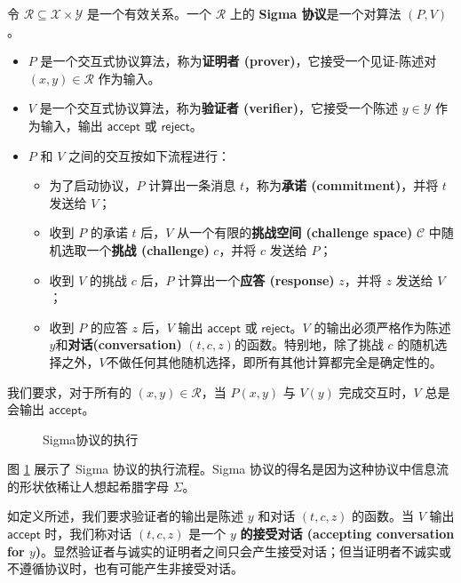 \begin{definition}[Sigma 协议]
令 $\mathcal{R}\subseteq\mathcal{X}×\mathcal{Y}$ 是一个有效关系。一个 $\mathcal{R}$ 上的 \textbf{Sigma 协议}是一个对算法 $(P,V)$。
\begin{itemize}
	\item $P$ 是一个交互式协议算法，称为\textbf{证明者 (prover)}，它接受一个见证-陈述对 $(x,y)\in\mathcal{R}$ 作为输入。
	\item $V$ 是一个交互式协议算法，称为\textbf{验证者 (verifier)}，它接受一个陈述 $y\in\mathcal{Y}$ 作为输入，输出 $\mathsf{accept}$ 或 $\mathsf{reject}$。
	\item $P$ 和 $V$ 之间的交互按如下流程进行：
		\begin{itemize}
			\item 为了启动协议，$P$ 计算出一条消息 $t$，称为\textbf{承诺 (commitment)}，并将 $t$ 发送给 $V$；
			\item 收到 $P$ 的承诺 $t$ 后，$V$ 从一个有限的\textbf{挑战空间 (challenge space)} $\mathcal{C}$ 中随机选取一个\textbf{挑战 (challenge)} $c$，并将 $c$ 发送给 $P$；
			\item 收到 $V$ 的挑战 $c$ 后，$P$ 计算出一个\textbf{应答 (response)} $z$，并将 $z$ 发送给 $V$；
			\item 收到 $P$ 的应答 $z$ 后，$V$ 输出 $\mathsf{accept}$ 或 $\mathsf{reject}$。$V$ 的输出必须严格作为陈述$y$和\textbf{对话(conversation)} $(t,c,z)$的函数。特别地，除了挑战 $c$ 的随机选择之外，$V$不做任何其他随机选择，即所有其他计算都完全是确定性的。
		\end{itemize}
\end{itemize}
我们要求，对于所有的 $(x,y)\in\mathcal{R}$，当 $P(x,y)$ 与 $V(y)$ 完成交互时，$V$ 总是会输出 $\mathsf{accept}$。
\end{definition}

\begin{figure}[hbt]
  \centering
  
  \caption{Sigma协议的执行}
  \label{fig:19-5}
\end{figure}

图 \ref{fig:19-5} 展示了 Sigma 协议的执行流程。Sigma 协议的得名是因为这种协议中信息流的形状依稀让人想起希腊字母 $\Sigma$。

如定义所述，我们要求验证者的输出是陈述 $y$ 和对话 $(t,c,z)$ 的函数。当 $V$ 输出 $\mathsf{accept}$ 时，我们称对话 $(t,c,z)$ 是一个 $y$ \textbf{的接受对话 (accepting conversation for $y$)}。显然验证者与诚实的证明者之间只会产生接受对话；但当证明者不诚实或不遵循协议时，也有可能产生非接受对话。

